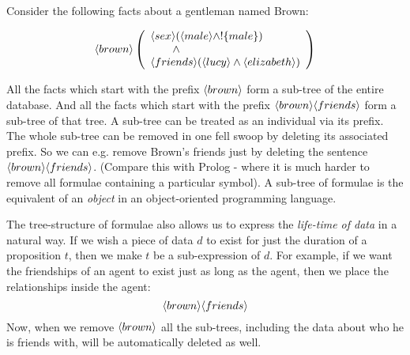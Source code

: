 
\NI Consider the following facts about a gentleman named Brown:

\[
   \langle brown \rangle \left(
   \begin{array}{l}
     \langle sex \rangle (\langle male \rangle \land ! \{male\}) \\
        \qquad \land \\
     \langle friends \rangle (\langle lucy \rangle \land \langle elizabeth \rangle ) 
   \end{array}
   \right)
\]

\NI All the facts which start with the prefix $\MAY{brown}$ form a
sub-tree of the entire database.  And all the facts which start with
the prefix $\MAY{brown} \MAY{friends}$ form a sub-tree of that tree.
A sub-tree can be treated as an individual via its prefix.  The whole
sub-tree can be removed in one fell swoop by deleting its associated
prefix.  So we can e.g. remove Brown's friends just by deleting the
sentence $\MAY{brown} \MAY{friends}$.  (Compare this with Prolog -
where it is much harder to remove all formulae containing a particular
symbol).  A sub-tree of formulae is the \ELABR{} equivalent of an
\emph{object} in an object-oriented programming language.

The tree-structure of formulae also allows us to express the \emph{life-time of data} in a natural way. 
If we wish a piece of data $d$ to exist for just the duration of a proposition $t$, then we make $t$ be a sub-expression of $d$. 
For example, if we want the friendships of an agent to exist just as long as the agent, then we place the relationships inside the agent: 
\[
\langle brown \rangle \langle friends \rangle \]
Now, when we remove $\MAY{brown}$ all the sub-trees, including the data about who he is friends with, will be automatically deleted as well.

